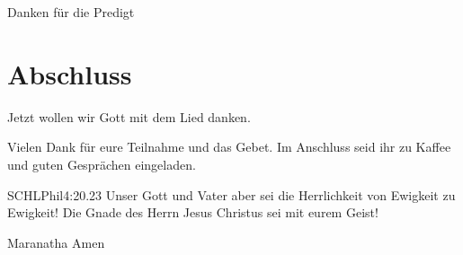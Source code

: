 Danken für die Predigt

\section{Abschluss}

Jetzt wollen wir Gott mit dem Lied  danken.


Vielen Dank für eure Teilnahme und das Gebet. Im Anschluss seid ihr zu Kaffee und guten Gesprächen eingeladen.
\beten{}

\begin{bibeltext}{SCHL}{Phil}{4:20.23}
Unser Gott und Vater aber sei die Herrlichkeit von Ewigkeit zu Ewigkeit!
Die Gnade des Herrn Jesus Christus sei mit eurem Geist!
\end{bibeltext}

Maranatha Amen
